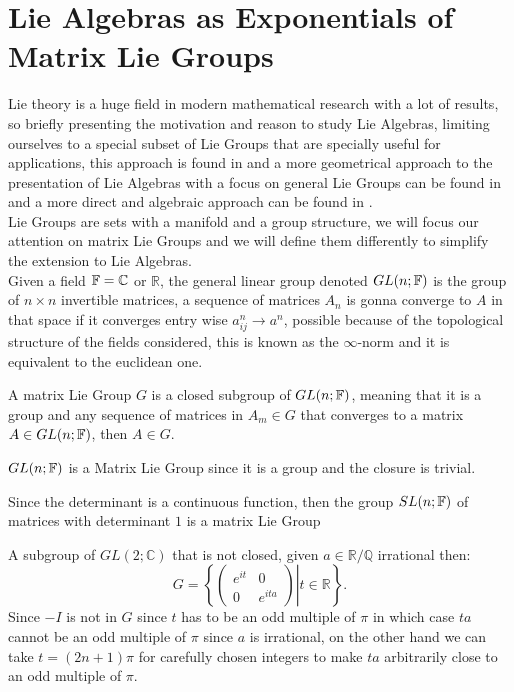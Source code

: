 \section{Lie Algebras as Exponentials of Matrix Lie Groups}
Lie theory is a huge field in modern mathematical research with a lot of results, so briefly presenting the motivation and reason to study Lie Algebras, limiting ourselves to a special subset of Lie Groups that are specially useful for applications, this approach is found in \cite{brian} and a more geometrical approach to the presentation of Lie Algebras with a focus on general Lie Groups can be found in \cite{kirillov} and a more direct and algebraic approach can be found in \cite{kaclec}.\\
Lie Groups are sets with a manifold and a group structure, we will focus our attention on matrix Lie Groups and we will define them differently to simplify the extension to Lie Algebras.\\
Given a field $\mathbb{F}=\mathbb{C}$ or $\mathbb{R}$, the general linear group denoted $GL(n;\mathbb{F})$ is the group of $n\times n$ invertible matrices, a sequence of matrices $A_n$ is gonna converge to $A$ in that space if it converges entry wise $a^n_{ij} \rightarrow a^n$, possible because of the topological structure of the fields considered, this is known as the $\infty$-norm and it is equivalent to the euclidean one.
\begin{defi}
	A matrix Lie Group $G$ is a closed subgroup of $GL(n;\mathbb{F})$, meaning that it is a group and any sequence of matrices in $A_m \in G$ that converges to a matrix $A \in GL(n;\mathbb{F})$, then $A \in G$.
	\label{MATRIXLIEGROUPDEF}
\end{defi}
\begin{ex}
	$GL(n;\mathbb{F})$ is a Matrix Lie Group since it is a group and the closure is trivial.
\end{ex}
\begin{ex}
Since the determinant is a continuous function, then the group $SL(n;\mathbb{F})$ of matrices with determinant $1$ is a matrix Lie Group
\end{ex}
\begin{ex}A subgroup of $GL(2;\mathbb{C})$ that is not closed, given $a\in \mathbb{R}/\mathbb{Q}$ irrational then:
		$$G=\left\{\left.\begin{pmatrix}
		e^{it} & 0 \\
		0 & e^{ita}	\end{pmatrix} \right| t \in \mathbb{R}\right\}.$$
		Since $-I$ is not in $G$ since $t$ has to be an odd multiple of $\pi$ in which case $ta$ cannot be an odd multiple of $\pi$ since $a$ is irrational, on the other hand we can take $t=(2n+1)\pi$ for carefully chosen integers to make $ta$ arbitrarily close to an odd multiple of $\pi$.\\
\end{ex}

